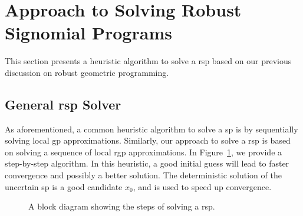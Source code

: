 \section{Approach to Solving Robust Signomial Programs}

This section presents a heuristic algorithm to solve a \gls{rsp}
based on our previous discussion on robust geometric programming.

\subsection{General \gls{rsp} Solver}
As aforementioned, a common heuristic algorithm to solve a \gls{sp} is
by sequentially solving local \gls{gp} approximations.
Similarly, our approach to solve a \gls{rsp} is based on solving
a sequence of local \gls{rgp} approximations. In Figure~\ref{fig:rspsolve},
we provide a step-by-step algorithm.
In this heuristic, a good initial guess will lead to faster
convergence and possibly a better solution.
The deterministic solution of the uncertain \gls{sp} is a good candidate $x_0$,
and is used to speed up convergence.

\begin{figure}
    \begin{center}
    \caption{A block diagram showing the steps of solving a \gls{rsp}.}
        \label{fig:rspsolve}
\end{center}
\end{figure}

